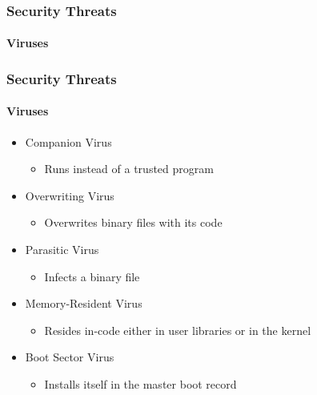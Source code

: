 \documentclass{beamer}
\begin{document}
	\begin{frame}
	\frametitle{Security Threats}
	\framesubtitle{Viruses}
	\begin{itemize}
	\setlength\itemsep{1.5em}
	\end{itemize}
	\end{frame}

	\begin{frame}
	\frametitle{Security Threats}
	\framesubtitle{Viruses}
	\begin{itemize}
	\setlength\itemsep{1.5em}
		\item Companion Virus
		\begin{itemize}
			\item Runs instead of a trusted program
		\end{itemize}

		\item Overwriting Virus
		\begin{itemize}
			\item Overwrites binary files with its code
		\end{itemize}

		\item Parasitic Virus
		\begin{itemize}
			\item Infects a binary file
		\end{itemize}

		\item Memory-Resident Virus
		\begin{itemize}
			\item Resides in-code either in user libraries or in the
			kernel
		\end{itemize}
	
		\item Boot Sector Virus
		\begin{itemize}
			\item Installs itself in the master boot record
		\end{itemize}
	\end{itemize}
	\end{frame}
\end{document}
